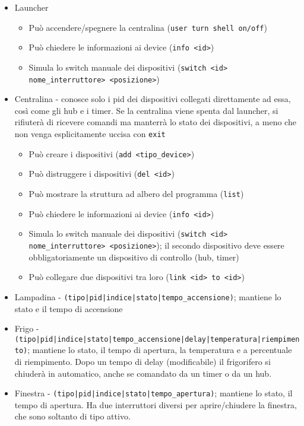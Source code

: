 \documentclass[11pt]{article}
\begin{document}
\begin{itemize}
    \item Launcher
          \begin{itemize}
              \item Può accendere/spegnere la centralina (\verb|user turn shell on/off|)
              \item Può chiedere le informazioni ai device (\verb|info <id>|)
              \item Simula lo switch manuale dei dispositivi (\verb|switch <id> nome_interruttore> <posizione>|)
          \end{itemize}
    \item Centralina - conosce solo i pid dei dispositivi collegati direttamente ad essa, così come gli hub e i timer. Se la centralina viene spenta dal launcher, si rifiuterà di ricevere comandi ma manterrà lo stato dei dispositivi, a meno che non venga esplicitamente uccisa con \verb|exit|
          \begin{itemize}
              \item Può creare i dispositivi (\verb|add <tipo_device>|)
              \item Può distruggere i dispositivi (\verb|del <id>|)
              \item Può mostrare la struttura ad albero del programma (\verb|list|)
              \item Può chiedere le informazioni ai device (\verb|info <id>|)
              \item Simula lo switch manuale dei dispositivi (\verb|switch <id> nome_interruttore> <posizione>|); il secondo dispositivo deve essere obbligatoriamente un dispositivo di controllo (hub, timer)
              \item Può collegare due dispositivi tra loro (\verb|link <id> to <id>|)
          \end{itemize}
    \item Lampadina - \verb=(tipo|pid|indice|=\verb=stato|tempo_accensione)=; mantiene lo stato e il tempo di accensione
    \item Frigo -  \verb=(tipo|pid|indice|=\verb=stato|=\verb=tempo_accensione|delay=\verb=|temperatura|=\verb=riempimento)=; mantiene lo stato, il tempo di apertura, la temperatura e a percentuale di riempimento. Dopo un tempo di delay (modificabile) il frigorifero si chiuderà in automatico, anche se comandato da un timer o da un hub.
    \item Finestra - \verb=(tipo|pid|indice=\verb=|stato|tempo_apertura)=; mantiene lo stato, il tempo di apertura. Ha due interruttori diversi per aprire/chiudere la finestra, che sono soltanto di tipo attivo.

\end{itemize}
\end{document}

